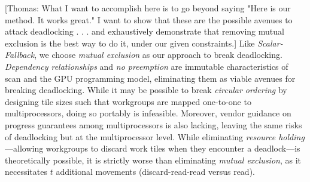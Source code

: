 \documentclass[sigconf]{acmart}
\newcommand{\thomas}[1]{{\footnotesize\color{orange}[Thomas: #1]}}
\begin{document}
\thomas{What I want to accomplish here is to go beyond saying "Here is our method. It works great." I want to show that these are the possible avenues to attack deadlocking . . . and exhaustively demonstrate that removing mutual exclusion is the best way to do it, under our given constraints.}
Like \emph{Scalar-Fallback}, we choose \emph{mutual exclusion} as our approach to break deadlocking. \emph{Dependency relationships} and \emph{no preemption} are immutable characteristics of scan and the GPU programming model, eliminating them as viable avenues for breaking deadlocking. While it may be possible to break \emph{circular ordering} by designing tile sizes such that workgroups are mapped one-to-one to multiprocessors, doing so portably is infeasible. Moreover, vendor guidance on progress guarantees among multiprocessors is also lacking, leaving the same risks of deadlocking but at the multiprocessor level. While eliminating \emph{resource holding}---allowing workgroups to discard work tiles when they encounter a deadlock---is theoretically possible, it is strictly worse than eliminating \emph{mutual exclusion}, as it necessitates $t$ additional movements (discard-read-read versus read).
\end{document}
